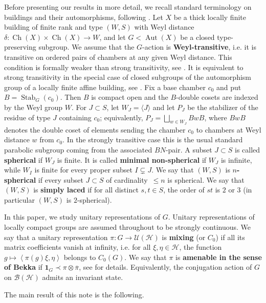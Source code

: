 \documentclass[12pt,a4paper]{amsproc}
\theoremstyle{definition}
\DeclareMathOperator{\Aut}{Aut}
\DeclareMathOperator{\Stab}{Stab}
\DeclareMathOperator{\ch}{Ch}
\newcommand{\cH}{\mathcal H}
\newcommand{\cU}{\mathcal U}
\newcommand{\one}{\mathbf 1}
\newcommand{\ol}[1]{\overline{#1}}
\newcommand{\ip}[2]{\left\langle #1,#2\right\rangle}
\newcommand{\weakcontain}{\prec}
\begin{document}
Before presenting our results in more detail, we  recall  standard terminology on buildings and their automorphisms, following \cite{AbramenkoBrown}. Let $X$ be a thick locally finite building of finite rank and type $(W,S)$ with Weyl distance $\delta \colon \ch(X) \times \ch(X) \to W$, and let $G<\Aut(X)$ be a closed type-preserving subgroup. We assume that the $G$-action is  \textbf{Weyl-transitive}, i.e. it is transitive on ordered pairs of chambers at any given Weyl distance. This condition is formally weaker than strong transitivity, see  \cite[Corollary~6.12]{AbramenkoBrown}. It is equivalent to strong transitivity in the special case of closed subgroups of the automorphism group of a locally finite affine building, see \cite[Theorem~5.16]{Kramer}. Fix a base chamber $c_0$ and put $B=\Stab_G(c_0)$. Then $B$ is compact open and the $B$-double cosets are indexed by the Weyl group $W$. For $J\subset S$, let $W_J=\langle J\rangle$ and let $P_J$ be the stabilizer of the  residue of type $J$ containing $c_0$; equivalently, $P_J=\bigsqcup_{w\in W_J} BwB$, where $BwB$ denotes the double coset of elements sending the chamber $c_0$ to chambers at Weyl distance $w$ from $c_0$. In the strongly transitive case this is the usual standard parabolic subgroup coming from the associated $BN$-pair.
A subset $J\subset S$ is called \textbf{spherical} if $W_J$ is finite. It is called \textbf{minimal non-spherical} if $W_J$ is infinite, while $W_I$ is finite for every proper subset $I\subsetneq J$. We say that $(W, S)$ is \textbf{$n$-spherical} if every subset $J \subset S$ of cardinality~$\leq n$ is spherical. We say that $(W, S)$ is \textbf{simply laced} if for all distinct $s, t \in S$, the order of $st$ is $2$ or $3$ (in particular $(W, S)$ is $2$-spherical). 

In this paper, we study unitary representations of $G$. Unitary representations of locally compact groups are assumed throughout to be strongly continuous. We say that a  unitary representation $\pi \colon G\to\cU(\cH)$ is \textbf{mixing} (or $C_0$) if all its matrix coefficients vanish at infinity, i.e. for all $\xi,\eta\in\cH$, the function $g\mapsto \ip{\pi(g)\xi}{\eta}$ belongs to $C_0(G)$.
We say that $\pi$ is \textbf{amenable in the sense of Bekka} if $\one_G\weakcontain \pi\otimes\ol\pi$, see \cite{BekkaAmenable} for details. Equivalently, the conjugation action of $G$ on $\mathcal B(\cH)$ admits an invariant state.

\medskip

The main result  of this note is the following.
\end{document}
